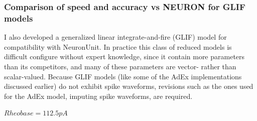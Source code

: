 




\subsubsection{Comparison of speed and accuracy vs NEURON for GLIF models}
I also developed a generalized linear integrate-and-fire (GLIF) model for compatibility with NeuronUnit.
In practice this class of reduced models is difficult configure without expert knowledge, since it contain more parameters than its competitors, and many of these parameters are vector- rather than scalar-valued.
Because GLIF models (like some of the AdEx implementations discussed earlier) do not exhibit spike waveforms, revisions such as the ones used for the AdEx model, imputing spike waveforms, are required.

$ Rheobase = 112.5pA $
